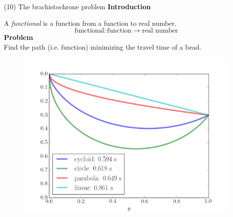 \documentclass[11pt, aspectratio=149]{beamer}
\theoremstyle{plain}
\begin{document}

\begin{frame}[fragile, t]{(10) The brachistochrone problem}
	\textbf{Introduction}\\ \vspace*{0.5em} 
	
	A \emph{functional} is a function from a function to real number.
	\begin{equation*}
		\text{functional} : \text{function} \to \text{real number}
	\end{equation*}
	\textbf{Problem} \\
	Find the path (i.e. function) minimizing the travel time of a bead.
	\begin{figure}
		\centering
		\includegraphics[width=0.5\linewidth]{figs/brachistochrone2.png}
	\end{figure}
\end{frame}
\end{document}
